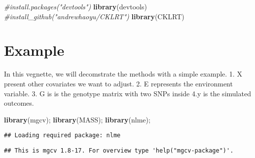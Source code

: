 \documentclass[11pt,]{article}
\newenvironment{Shaded}{\begin{snugshade}}{\end{snugshade}}
\newcommand{\KeywordTok}[1]{\textcolor[rgb]{0.13,0.29,0.53}{\textbf{#1}}}
\newcommand{\CommentTok}[1]{\textcolor[rgb]{0.56,0.35,0.01}{\textit{#1}}}
\newcommand{\NormalTok}[1]{#1}
\begin{document}
\begin{Shaded}
\begin{Highlighting}[]
\CommentTok{#install.packages("devtools")  }
\KeywordTok{library}\NormalTok{(devtools)  }
\CommentTok{#install_github("andrewhaoyu/CKLRT")}
\KeywordTok{library}\NormalTok{(CKLRT)}
\end{Highlighting}
\end{Shaded}

\section{Example}\label{example}

In this vegnette, we will decomstrate the methods with a simple example.
1. X present other covariates we want to adjust. 2. E represents the
environment variable. 3. G is is the genotype matrix with two SNPs
inside 4.y is the simulated outcomes.

\begin{Shaded}
\begin{Highlighting}[]
\KeywordTok{library}\NormalTok{(mgcv); }\KeywordTok{library}\NormalTok{(MASS); }\KeywordTok{library}\NormalTok{(nlme);}
\end{Highlighting}
\end{Shaded}

\begin{verbatim}
## Loading required package: nlme
\end{verbatim}

\begin{verbatim}
## This is mgcv 1.8-17. For overview type 'help("mgcv-package")'.
\end{verbatim}
\end{document}

